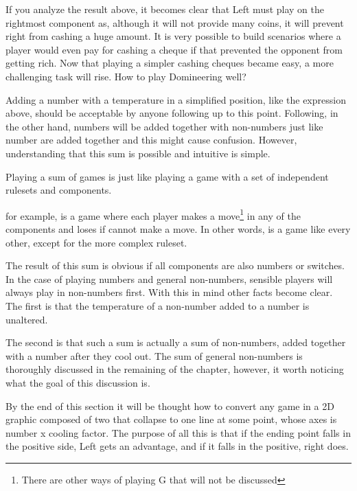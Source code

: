 If you analyze the result above, it becomes clear that Left must play on the rightmost component as, although it will not provide many coins, it will prevent right from cashing a huge amount. It is very possible to build scenarios where a player would even pay for cashing a cheque if that prevented the opponent from getting rich. Now that playing a simpler cashing cheques became easy, a more challenging task will rise. How to play Domineering well?

Adding a number with a temperature in a simplified position, like the expression above, should be acceptable by anyone following up to this point. Following, in the other hand, numbers will be added together with non-numbers just like number are added together and this might cause confusion. However, understanding that this sum is possible and intuitive is simple.

Playing a sum of games is just like playing a game with a set of independent rulesets and components. \begin{center}
\end{center}
for example, is a game where each player makes a move\footnote{There are other ways of playing G that will not be discussed} in any of the components and loses if cannot make a move. In other words, \Gm{} is a game like every other, except for the more complex ruleset.

The result of this sum is obvious if all components are also numbers or switches. In the case of playing numbers and general non-numbers, sensible players will always play in non-numbers first. With this in mind other facts become clear. The first is that the temperature of a non-number added to a number is unaltered.

The second is that such a sum is actually a sum of non-numbers, added together with a number after they cool out. The sum of general non-numbers is thoroughly discussed in the remaining of the chapter, however, it worth noticing what the goal of this discussion is.

By the end of this section it will be thought how to convert any game in a 2D graphic composed of two  that collapse to one line at some point, whose axes is number x cooling factor. The purpose of all this is that if the ending point falls in the positive side, Left gets an advantage, and if it falls in the positive, right does.

